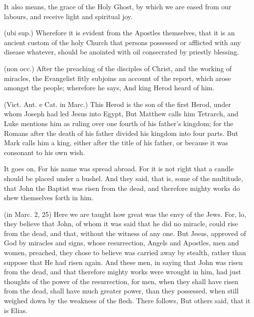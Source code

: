  It also means, the grace of the Holy Ghost, by which we are eased from our labours, and receive light and spiritual joy.

 (ubi sup.) Wherefore it is evident from the Apostles themselves, that it is an ancient custom of the holy Church that persons possessed or afflicted with any disease whatever, should be anointed with oil consecrated by priestly blessing.

 

 (non occ.) After the preaching of the disciples of Christ, and the working of miracles, the Evangelist fitly subjoins an account of the report, which arose amongst the people; wherefore he says, And king Herod heard of him.

 (Vict. Ant. e Cat. in Marc.) This Herod is the son of the first Herod, under whom Joseph had led Jesus into Egypt, But Matthew calls him Tetrarch, and Luke mentions him as ruling over one fourth of his father’s kingdom; for the Romans after the death of his father divided his kingdom into four parts. But Mark calls him a king, either after the title of his father, or because it was consonant to his own wish.

 It goes on, For his name was spread abroad. For it is not right that a candle should be placed under a bushel. And they said, that is, some of the multitude, that John the Baptist was risen from the dead, and therefore mighty works do shew themselves forth in him.

 (in Marc. 2, 25) Here we are taught how great was the envy of the Jews. For, lo, they believe that John, of whom it was said that he did no miracle, could rise from the dead, and that, without the witness of any one. But Jesus, approved of God by miracles and signs, whose resurrection, Angels and Apostles, men and women, preached, they chose to believe was carried away by stealth, rather than suppose that He had risen again. And these men, in saying that John was risen from the dead, and that therefore mighty works were wrought in him, had just thoughts of the power of the resurrection, for men, when they shall have risen from the dead, shall have much greater power, than they possessed, when still weighed down by the weakness of the flesh. There follows, But others said, that it is Elias.


